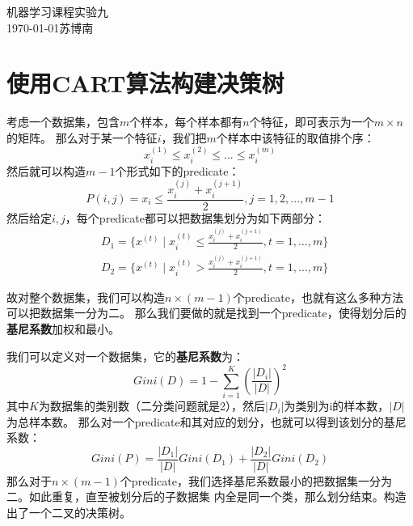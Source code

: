 \documentclass{article}
\begin{document}
\begin{center}
    \huge{机器学习课程实验九}\\
    \large{\today \quad 苏博南}
\end{center}
\section{使用CART算法构建决策树}
考虑一个数据集，包含$m$个样本，每个样本都有$n$个特征，即可表示为一个$m\times n$的矩阵。
那么对于某一个特征$i$，我们把$m$个样本中该特征的取值排个序：
\begin{equation}
	x_i^{(1)}\leq x_i^{(2)}\leq...\leq x_i^{(m)}
\end{equation}
然后就可以构造$m-1$个形式如下的predicate：
\begin{equation}
	P(i,j)=x_i\leq \frac{x_i^{(j)}+x_i^{(j+1)}}{2},j=1,2,...,m-1
\end{equation}
然后给定$i,j$，每个predicate都可以把数据集划分为如下两部分：
\begin{equation}
	\begin{aligned}
		& D_1=\{x^{(t)}\;|\;x_i^{(t)}\leq\frac{x_i^{(j)}+x_i^{(j+1)}}{2},t=1,...,m\}\\
		& D_2=\{x^{(t)}\;|\;x_i^{(t)}>\frac{x_i^{(j)}+x_i^{(j+1)}}{2},t=1,...,m\}
	\end{aligned}
\end{equation}

故对整个数据集，我们可以构造$n\times(m-1)$个predicate，也就有这么多种方法可以把数据集一分为二。
那么我们要做的就是找到一个predicate，使得划分后的\textbf{基尼系数}加权和最小。

我们可以定义对一个数据集，它的\textbf{基尼系数}为：
\begin{equation}
		Gini(D)=1-\sum_{i=1}^K(\frac{|D_i|}{|D|})^2	
\end{equation}
其中$K$为数据集的类别数（二分类问题就是2），然后$|D_i|$为类别为i的样本数，$|D|$为总样本数。
那么对一个predicate和其对应的划分，也就可以得到该划分的基尼系数：
\begin{equation}
	Gini(P)=\frac{|D_1|}{|D|}Gini(D_1)+\frac{|D_2|}{|D|}Gini(D_2)
\end{equation}
那么对于$n\times(m-1)$个predicate，我们选择基尼系数最小的把数据集一分为二。如此重复，直至被划分后的子数据集
内全是同一个类，那么划分结束。构造出了一个二叉的决策树。
\end{document}
